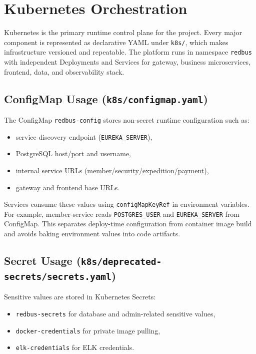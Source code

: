 \documentclass[12pt,a4paper]{article}
\begin{document}
\section{Kubernetes Orchestration}

Kubernetes is the primary runtime control plane for the project. Every major component is represented as declarative YAML under \texttt{k8s/}, which makes infrastructure versioned and repeatable. The platform runs in namespace \texttt{redbus} with independent Deployments and Services for gateway, business microservices, frontend, data, and observability stack.

\subsection{ConfigMap Usage (\texttt{k8s/configmap.yaml})}

The ConfigMap \texttt{redbus-config} stores non-secret runtime configuration such as:
\begin{itemize}
    \item service discovery endpoint (\texttt{EUREKA\_SERVER}),
    \item PostgreSQL host/port and username,
    \item internal service URLs (member/security/expedition/payment),
    \item gateway and frontend base URLs.
\end{itemize}

Services consume these values using \texttt{configMapKeyRef} in environment variables. For example, member-service reads \texttt{POSTGRES\_USER} and \texttt{EUREKA\_SERVER} from ConfigMap. This separates deploy-time configuration from container image build and avoids baking environment values into code artifacts.

\subsection{Secret Usage (\texttt{k8s/deprecated-secrets/secrets.yaml})}

Sensitive values are stored in Kubernetes Secrets:
\begin{itemize}
    \item \texttt{redbus-secrets} for database and admin-related sensitive values,
    \item \texttt{docker-credentials} for private image pulling,
    \item \texttt{elk-credentials} for ELK credentials.
\end{itemize}
\end{document}
